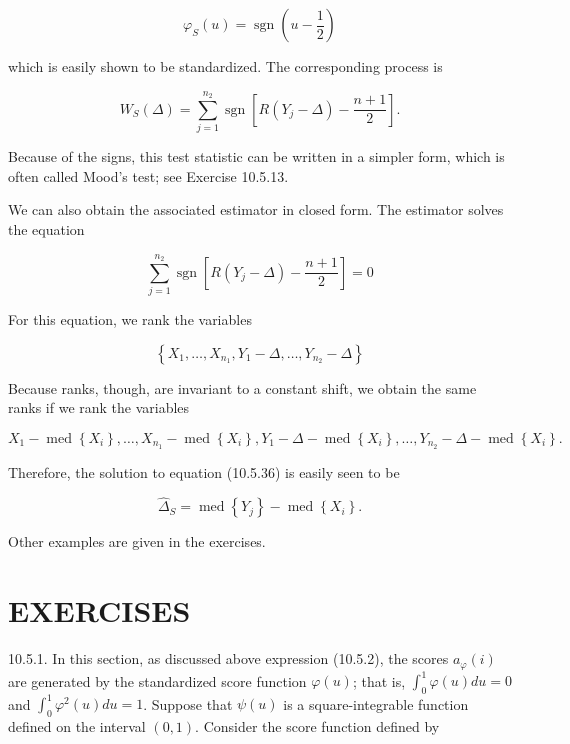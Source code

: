 \begin{equation*}
\varphi_{S}(u)=\operatorname{sgn}\left(u-\frac{1}{2}\right) \tag{10.5.34}
\end{equation*}


which is easily shown to be standardized. The corresponding process is


\begin{equation*}
W_{S}(\Delta)=\sum_{j=1}^{n_{2}} \operatorname{sgn}\left[R\left(Y_{j}-\Delta\right)-\frac{n+1}{2}\right] . \tag{10.5.35}
\end{equation*}


Because of the signs, this test statistic can be written in a simpler form, which is often called Mood's test; see Exercise 10.5.13.

We can also obtain the associated estimator in closed form. The estimator solves the equation


\begin{equation*}
\sum_{j=1}^{n_{2}} \operatorname{sgn}\left[R\left(Y_{j}-\Delta\right)-\frac{n+1}{2}\right]=0 \tag{10.5.36}
\end{equation*}


For this equation, we rank the variables

$$
\left\{X_{1}, \ldots, X_{n_{1}}, Y_{1}-\Delta, \ldots, Y_{n_{2}}-\Delta\right\}
$$

Because ranks, though, are invariant to a constant shift, we obtain the same ranks if we rank the variables

$$
X_{1}-\operatorname{med}\left\{X_{i}\right\}, \ldots, X_{n_{1}}-\operatorname{med}\left\{X_{i}\right\}, Y_{1}-\Delta-\operatorname{med}\left\{X_{i}\right\}, \ldots, Y_{n_{2}}-\Delta-\operatorname{med}\left\{X_{i}\right\} .
$$

Therefore, the solution to equation (10.5.36) is easily seen to be


\begin{equation*}
\widehat{\Delta}_{S}=\operatorname{med}\left\{Y_{j}\right\}-\operatorname{med}\left\{X_{i}\right\} . \tag{10.5.37}
\end{equation*}


Other examples are given in the exercises.

\section*{EXERCISES}
10.5.1. In this section, as discussed above expression (10.5.2), the scores $a_{\varphi}(i)$ are generated by the standardized score function $\varphi(u)$; that is, $\int_{0}^{1} \varphi(u) d u=0$ and $\int_{0}^{1} \varphi^{2}(u) d u=1$. Suppose that $\psi(u)$ is a square-integrable function defined on the interval $(0,1)$. Consider the score function defined by

